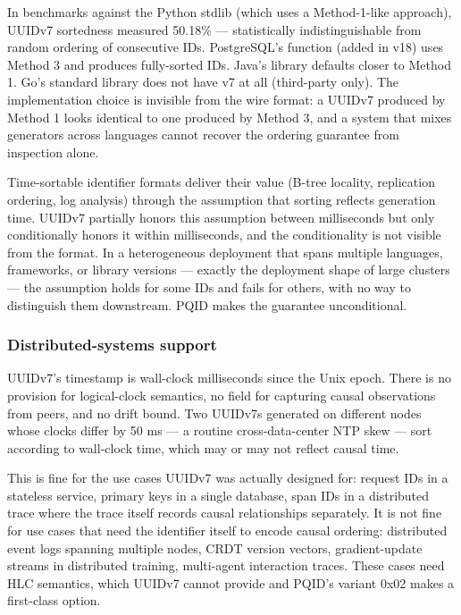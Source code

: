 In benchmarks against the Python  stdlib (which uses a Method-1-like approach), UUIDv7 sortedness measured 50.18\% --- statistically indistinguishable from random ordering of consecutive IDs. PostgreSQL's  function (added in v18) uses Method 3 and produces fully-sorted IDs. Java's  library defaults closer to Method 1. Go's standard library does not have v7 at all (third-party only). The implementation choice is invisible from the wire format: a UUIDv7 produced by Method 1 looks identical to one produced by Method 3, and a system that mixes generators across languages cannot recover the ordering guarantee from inspection alone.

\begin{calloutwarning}
Time-sortable identifier formats deliver their value (B-tree locality, replication ordering, log analysis) through the assumption that sorting reflects generation time. UUIDv7 partially honors this assumption between milliseconds but only conditionally honors it within milliseconds, and the conditionality is not visible from the format. In a heterogeneous deployment that spans multiple languages, frameworks, or library versions --- exactly the deployment shape of large clusters --- the assumption holds for some IDs and fails for others, with no way to distinguish them downstream. PQID makes the guarantee unconditional.
\end{calloutwarning}

\subsubsection{Distributed-systems support}

UUIDv7's timestamp is wall-clock milliseconds since the Unix epoch. There is no provision for logical-clock semantics, no field for capturing causal observations from peers, and no drift bound. Two UUIDv7s generated on different nodes whose clocks differ by 50 ms --- a routine cross-data-center NTP skew --- sort according to wall-clock time, which may or may not reflect causal time.

This is fine for the use cases UUIDv7 was actually designed for: request IDs in a stateless service, primary keys in a single database, span IDs in a distributed trace where the trace itself records causal relationships separately. It is not fine for use cases that need the identifier itself to encode causal ordering: distributed event logs spanning multiple nodes, CRDT version vectors, gradient-update streams in distributed training, multi-agent interaction traces. These cases need HLC semantics, which UUIDv7 cannot provide and PQID's variant 0x02 makes a first-class option.

